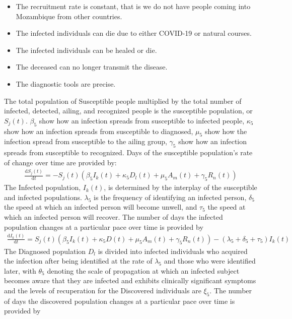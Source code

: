\documentclass{article}
\begin{document}
\begin{itemize}
     \item The recruitment rate is constant, that is we do not have people coming into Mozambique from other countries. 
     \item The infected individuals can die due to either COVID-19 or natural courses.
     \item The infected individuals can be healed or die.
     \item The deceased can no longer transmit the disease.
     \item The diagnostic tools are precise.
 \end{itemize}
 The total population of Susceptible people multiplied by the total number of infected, detected, ailing, and recognized people is the susceptible population, or $S_j(t)$. $\beta_5$ show how an infection spreads from susceptible to infected people, $\kappa_5$ show how an infection spreads from susceptible to diagnosed, $\mu_5$ show how the infection spread from susceptible to the ailing group, $\gamma_5$ show how an infection spreads from susceptible to recognized. Days of the susceptible population's rate of change over time are provided by:\\
 \begin{align}
     \frac{\text{d}S_j(t)}{\text{d}t} = -S_j(t)(\beta_5 I_k(t) +\kappa_5 D_l(t) +\mu_5 A_m(t)+\gamma_5 R_n(t))
 \end{align}
 The Infected population, $I_k(t)$, is determined by the interplay of the susceptible and infected populations. $\lambda_5$ is the frequency of identifying an infected person, $\delta_5$ the speed at which an infected person will become unwell, and $\tau_5$ the speed at which an infected person will recover. The number of days the infected population changes at a particular pace over time is provided by\\
\begin{align}
  \frac{\text{d}I_k(t)}{\text{d}t}=S_j(t)(\beta_5 I_k(t) +\kappa_5 D(t)+\mu_5 A_m(t)+\gamma_5 R_n(t))-(\lambda_5 +\delta_5 + \tau_5)I_k(t)  
 \end{align}
 The Diagnosed population $D_l$ is divided into infected individuals who acquired the infection after being identified at the rate of $\lambda_5$ and those who were identified later, with $\theta_5$ denoting the scale of propagation at which an infected subject becomes aware that they are infected and exhibits clinically significant symptoms and the levels of recuperation for the Discovered individuals are $\xi_5$. The number of days the discovered population changes at a particular pace over time is provided by\\
\end{document}
